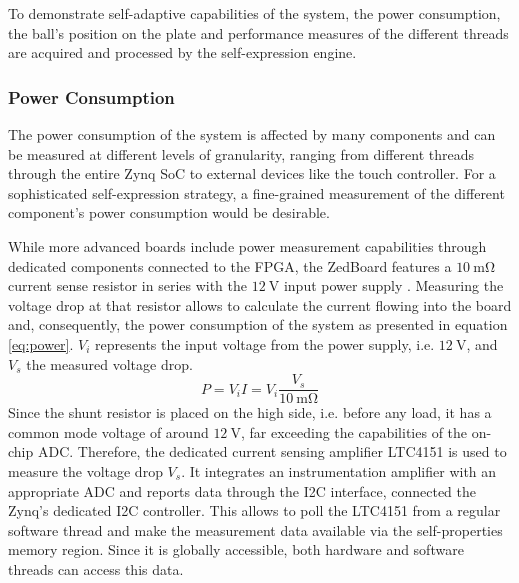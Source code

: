 To demonstrate self-adaptive capabilities of the system, the power
consumption, the ball's position on the plate and performance measures of the
different threads are acquired and processed by the self-expression engine.

\subsubsection{Power Consumption}
\label{sssec:power}
The power consumption of the system is affected by many components and can be
measured at different levels of granularity, ranging from different threads
through the entire Zynq \ac{SoC} to external devices like the touch
controller. For a sophisticated self-expression strategy, a fine-grained
measurement of the different component's power consumption would be desirable.

While more advanced boards include power measurement capabilities through
dedicated components connected to the FPGA, the ZedBoard features a
$\SI{10}{\milli\ohm}$ current sense resistor in series with the
$\SI{12}{\volt}$ input power supply \citep{ZedBoard}. Measuring the voltage
drop at that resistor allows to calculate the current flowing into the board
and, consequently, the power consumption of the system as presented in
equation \ref{eq:power}. $V_i$ represents the input voltage from the power
supply, i.e. $\SI{12}{\volt}$, and $V_s$ the measured voltage drop.
\begin{equation}
P = V_i I = V_i \frac{V_s}{\SI{10}{\milli\ohm}}
\label{eq:power}
\end{equation}
Since the shunt resistor is placed on the high side, i.e. before any load, it
has a common mode voltage of around $\SI{12}{\volt}$, far exceeding the
capabilities of the on-chip \ac{ADC}. Therefore, the dedicated current sensing
amplifier LTC4151 is used to measure the voltage drop $V_s$. It integrates an
instrumentation amplifier with an appropriate \ac{ADC} and reports data
through the \ac{I2C} interface, connected the Zynq's dedicated \ac{I2C}
controller. This allows to poll the LTC4151 from a regular software thread and
make the measurement data available via the self-properties memory region.
Since it is globally accessible, both hardware and software threads can access
this data.

